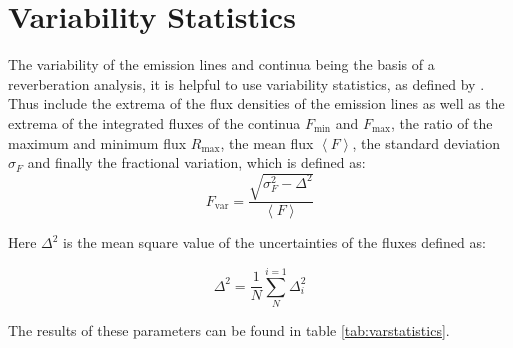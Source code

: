 \section{Variability Statistics}
The variability of the emission lines and continua being the basis of a reverberation analysis, it is helpful to use variability statistics, as defined by \cite{rodriguez1997steps}. Thus include the extrema of the flux densities of the emission lines as well as the extrema of the integrated fluxes of the continua $F_\mathrm{min}$ and $F_\mathrm{max}$, the ratio of the maximum and minimum flux $R_\mathrm{max}$, the mean flux $\left<F\right>$, the standard deviation $\sigma_F$ and finally the fractional variation, which is defined as: 
\begin{equation}
	F_\mathrm{var}=\frac{\sqrt{\sigma_F^2-\Delta^2}}{\left<F\right>}
\end{equation}

Here $\Delta^2$ is the mean square value of the uncertainties of the fluxes defined as:

\begin{equation}
	\Delta^2 = \frac{1}{N} \sum_{N}^{i=1}\Delta_i^2
\end{equation}

The results of these parameters can be found in table \ref{tab:varstatistics}. 






